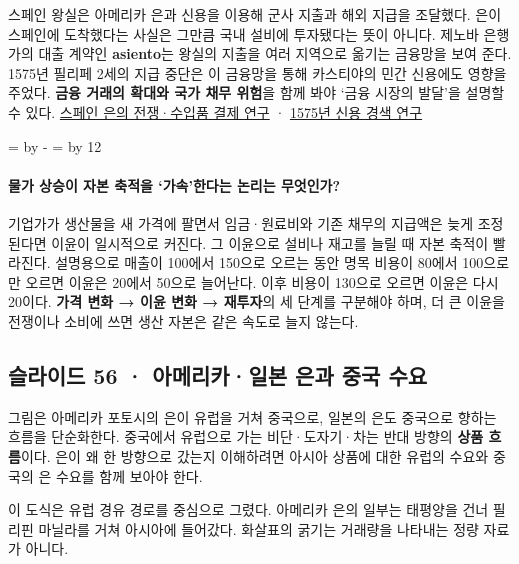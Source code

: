 \documentclass[10pt,a4paper]{article}
\newcommand{\ReserveQuestionSpace}{%
  \par\begingroup
  \dimen0=\pagegoal \advance\dimen0 by -\pagetotal
  \dimen2=\baselineskip \multiply\dimen2 by 12
  \ifdim\dimen0<\dimen2 \newpage\fi
  \endgroup}
\begin{document}
스페인 왕실은 아메리카 은과 신용을 이용해 군사 지출과 해외 지급을 조달했다. 은이 스페인에 도착했다는 사실은 그만큼 국내 설비에 투자됐다는 뜻이 아니다. 제노바 은행가의 대출 계약인 \textbf{asiento}는 왕실의 지출을 여러 지역으로 옮기는 금융망을 보여 준다. 1575년 필리페 2세의 지급 중단은 이 금융망을 통해 카스티야의 민간 신용에도 영향을 주었다. \textbf{금융 거래의 확대와 국가 채무 위험}을 함께 봐야 ‘금융 시장의 발달’을 설명할 수 있다. \href{https://www.cambridge.org/core/books/abs/economy-of-europe-in-an-age-of-crisis-16001750/dynamism-of-trade/D9F4E41FD7A3B77FE02B8750DFC95F8C}{스페인 은의 전쟁·수입품 결제 연구} · \href{https://www.cambridge.org/core/journals/revista-de-historia-economica-journal-of-iberian-and-latin-american-economic-history/article/abs/philip-ii-against-the-cortes-and-the-credit-freeze-of-15751577/3D50F00C9AA41B80A49F22B6E51C82C3}{1575년 신용 경색 연구}\par

\ReserveQuestionSpace
\paragraph{물가 상승이 자본 축적을 ‘가속’한다는 논리는 무엇인가?}
기업가가 생산물을 새 가격에 팔면서 임금·원료비와 기존 채무의 지급액은 늦게 조정된다면 이윤이 일시적으로 커진다. 그 이윤으로 설비나 재고를 늘릴 때 자본 축적이 빨라진다. 설명용으로 매출이 100에서 150으로 오르는 동안 명목 비용이 80에서 100으로만 오르면 이윤은 20에서 50으로 늘어난다. 이후 비용이 130으로 오르면 이윤은 다시 20이다. \textbf{가격 변화 → 이윤 변화 → 재투자}의 세 단계를 구분해야 하며, 더 큰 이윤을 전쟁이나 소비에 쓰면 생산 자본은 같은 속도로 늘지 않는다.\par

\subsection{슬라이드 56 · 아메리카·일본 은과 중국 수요}
그림은 아메리카 포토시의 은이 유럽을 거쳐 중국으로, 일본의 은도 중국으로 향하는 흐름을 단순화한다. 중국에서 유럽으로 가는 비단·도자기·차는 반대 방향의 \textbf{상품 흐름}이다. 은이 왜 한 방향으로 갔는지 이해하려면 아시아 상품에 대한 유럽의 수요와 중국의 은 수요를 함께 보아야 한다.\par

이 도식은 유럽 경유 경로를 중심으로 그렸다. 아메리카 은의 일부는 태평양을 건너 필리핀 마닐라를 거쳐 아시아에 들어갔다. 화살표의 굵기는 거래량을 나타내는 정량 자료가 아니다.\par
\end{document}

